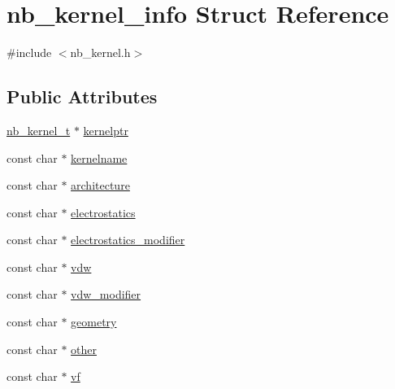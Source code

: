 \hypertarget{structnb__kernel__info}{\section{nb\-\_\-kernel\-\_\-info \-Struct \-Reference}
\label{structnb__kernel__info}
}


{\ttfamily \#include $<$nb\-\_\-kernel.\-h$>$}

\subsection*{\-Public \-Attributes}
\begin{DoxyCompactItemize}
\item 
\hyperlink{nb__kernel_8h_abbb4131bbf3e9f2a2a519b3c920de905}{nb\-\_\-kernel\-\_\-t} $\ast$ \hyperlink{structnb__kernel__info_a7e32113a8bad83856a4c68dbe6013014}{kernelptr}
\item 
const char $\ast$ \hyperlink{structnb__kernel__info_a3a0aa445894c2f5273ea47ce86db03fc}{kernelname}
\item 
const char $\ast$ \hyperlink{structnb__kernel__info_a4bf401e06ce13a5a8ae38770a3411747}{architecture}
\item 
const char $\ast$ \hyperlink{structnb__kernel__info_aa30978e39ce295d95f05ed55e6f902ed}{electrostatics}
\item 
const char $\ast$ \hyperlink{structnb__kernel__info_a7f8f01ec80b45056f06c4b9933ee0880}{electrostatics\-\_\-modifier}
\item 
const char $\ast$ \hyperlink{structnb__kernel__info_a29ab2c9625352e6ddc0169dd705236fd}{vdw}
\item 
const char $\ast$ \hyperlink{structnb__kernel__info_a3328117b9a7f45e647441d6e96692c90}{vdw\-\_\-modifier}
\item 
const char $\ast$ \hyperlink{structnb__kernel__info_a36a5baae920f0f2639b49d542d92d2ac}{geometry}
\item 
const char $\ast$ \hyperlink{structnb__kernel__info_ad2e07cbb35ebbe3569322786655aff59}{other}
\item 
const char $\ast$ \hyperlink{structnb__kernel__info_ac31392b2ec8304da3d2726fc75711bb6}{vf}
\end{DoxyCompactItemize}


